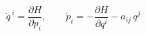 \begin{equation}
  \dot{q}^{\ i} = \frac{\partial H}{\partial p_i}, \qquad
  \dot{p}_i = - \frac{\partial H}{\partial q^i} - a_{ij}\, q^j
\label{lsys}
\end{equation}

